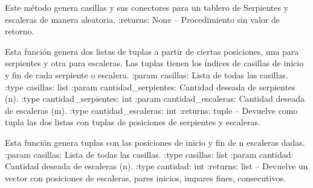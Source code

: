 \documentclass[letterpaper,10pt,english]{sphinxmanual}
\begin{document}
\begin{fulllineitems}

\begin{fulllineitems}
\label{\detokenize{codigo:tablero.TableroSE.generarCasillas}}
Este método genera casillas y sus conectores para un tablero de Serpientes y escaleras de manera aleatoria.
:returns:  None -- Procedimiento sin valor de retorno.

\end{fulllineitems}


\begin{fulllineitems}
\label{\detokenize{codigo:tablero.TableroSE.generar_conexiones}}
Esta función genera dos listas de tuplas a partir de ciertas posiciones, una para serpientes y otra para escaleras. 
Las tuplas tienen los índices de casillas de inicio y fin de cada serpiente o escalera.
:param casillas: Lista de todas las casillas.
:type casillas: list
:param cantidad\_serpientes: Cantidad deseada de serpientes (n).
:type cantidad\_serpientes: int
:param cantidad\_escaleras: Cantidad deseada de escaleras (m).
:type cantidad\_escaleras: int
:returns:  tuple -- Devuelve como tupla las dos listas con tuplas de posiciones de serpientes y escaleras.

\end{fulllineitems}


\begin{fulllineitems}
\label{\detokenize{codigo:tablero.TableroSE.generar_escaleras}}
Esta función genera tuplas con las posiciones de inicio y fin de n escaleras dadas.
:param casillas: Lista de todas las casillas.
:type casillas: list
:param cantidad: Cantidad deseada de escaleras (n).
:type cantidad: int
:returns:  list -- Devuelve un vector con posiciones de escaleras, pares inicios, impares fines, consecutivos.


\end{fulllineitems}
\end{fulllineitems}
\end{document}
